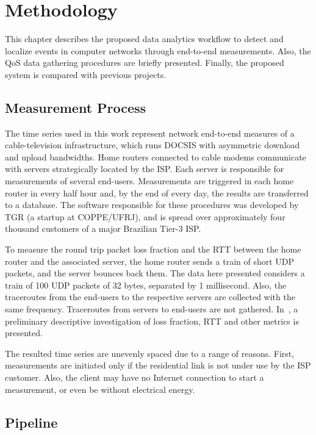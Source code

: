 \chapter{Methodology}
\label{chap:methodology}

This chapter describes the proposed data analytics workflow to detect and
localize events in computer networks through end-to-end measurements. Also, the
QoS data gathering procedures are briefly presented. Finally, the proposed
system is compared with previous projects.

\section{Measurement Process}

The time series used in this work represent network end-to-end measures of a
cable-television infrastructure, which runs DOCSIS with asymmetric download and
upload bandwidths. Home routers connected to cable modems communicate
with servers strategically located by the ISP\@. Each server is responsible
for measurements of several end-users.
Measurements are triggered in
each home router in every half hour and, by the end of every day,
the results are transferred to a database.
The software responsible for these procedures was
developed by TGR (a startup at COPPE/UFRJ),
and is spread over approximately four thousand customers of a major Brazilian
Tier-3 ISP\@.

To measure the round
trip packet loss fraction and the RTT between the home router and the associated
server, the
home router sends a train of short UDP packets, and the server bounces back
them. The data here presented considers a train of 100 UDP packets of 32 bytes,
separated by 1 millisecond.
Also, the traceroutes from the end-users
to the respective servers are collected with the same frequency. Traceroutes
from servers to end-users are not gathered.
In~\cite{a_preliminary_performance_measurement_study_of_residential_broadband_services_in_brazil},
a preliminary descriptive investigation of loss fraction, RTT and other metrics
is presented.

The resulted time series are unevenly spaced due to a range of reasons. First,
measurements are initiated only if the residential link is not under use by the
ISP customer. Also, the client may have no Internet connection to start a
measurement, or even be without electrical energy.

\section{Pipeline}

